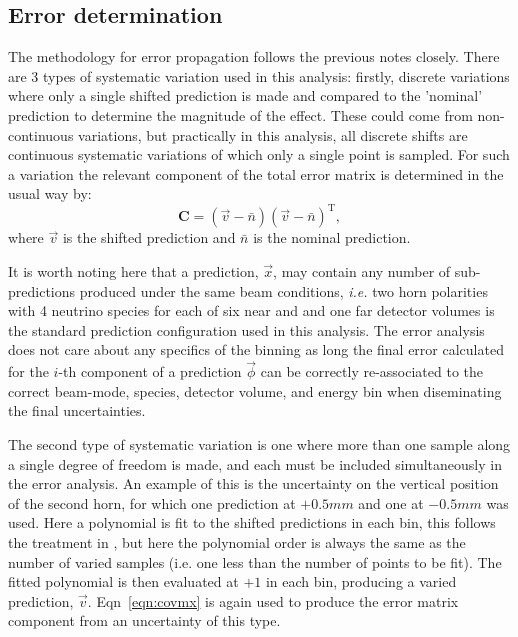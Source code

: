 \documentclass{article}
\begin{document}
\subsection{Error determination}
\label{sec:methodology__error_determination}

The methodology for error propagation follows the previous notes closely.
There are 3 types of systematic variation used in this analysis: firstly, discrete variations where only a single shifted prediction is made and compared to the 'nominal' prediction to determine the magnitude of the effect. These could come from non-continuous variations, but practically in this analysis, all discrete shifts are continuous systematic variations of which only a single point is sampled. For such a variation the relevant component of the total error matrix is determined in the usual way by:
\[\mathbf{C} = \left(\vec{v}-\bar{n}\right)\left(\vec{v}-\bar{n}\right)^{\mathrm{T}}\label{eqn:covmx},\]
where $\vec{v}$ is the shifted prediction and $\bar{n}$ is the nominal prediction.

It is worth noting here that a prediction, $\vec{x}$, may contain any number of sub-predictions produced under the same beam conditions, \textit{i.e.} two horn polarities with 4 neutrino species for each of six near and and one far detector volumes is the standard prediction configuration used in this analysis. The error analysis does not care about any specifics of the binning as long the final error calculated for the $i$-th component of a prediction $\vec{\phi}$ can be correctly re-associated to the correct beam-mode, species, detector volume, and energy bin when diseminating the final uncertainties.

The second type of systematic variation is one where more than one sample along a single degree of freedom is made, and each must be included simultaneously in the error analysis. An example of this is the uncertainty on the vertical position of the second horn, for which one prediction at $+0.5 mm$ and one at $-0.5 mm$ was used. Here a polynomial is fit to the shifted predictions in each bin, this follows the treatment in \cite{}, but here the polynomial order is always the same as the number of varied samples (i.e. one less than the number of points to be fit). The fitted polynomial is then evaluated at $+1$ in each bin, producing a varied prediction, $\vec{v}$. Eqn~\ref{eqn:covmx} is again used to produce the error matrix component from an uncertainty of this type.
\end{document}
